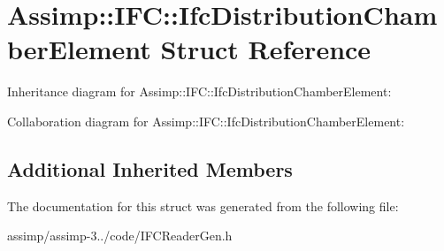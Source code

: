 \hypertarget{struct_assimp_1_1_i_f_c_1_1_ifc_distribution_chamber_element}{\section{Assimp\+:\+:I\+F\+C\+:\+:Ifc\+Distribution\+Chamber\+Element Struct Reference}
\label{struct_assimp_1_1_i_f_c_1_1_ifc_distribution_chamber_element}
}


Inheritance diagram for Assimp\+:\+:I\+F\+C\+:\+:Ifc\+Distribution\+Chamber\+Element\+:


Collaboration diagram for Assimp\+:\+:I\+F\+C\+:\+:Ifc\+Distribution\+Chamber\+Element\+:
\subsection*{Additional Inherited Members}


The documentation for this struct was generated from the following file\+:\begin{DoxyCompactItemize}
\item 
assimp/assimp-\/3../code/I\+F\+C\+Reader\+Gen.\+h\end{DoxyCompactItemize}
